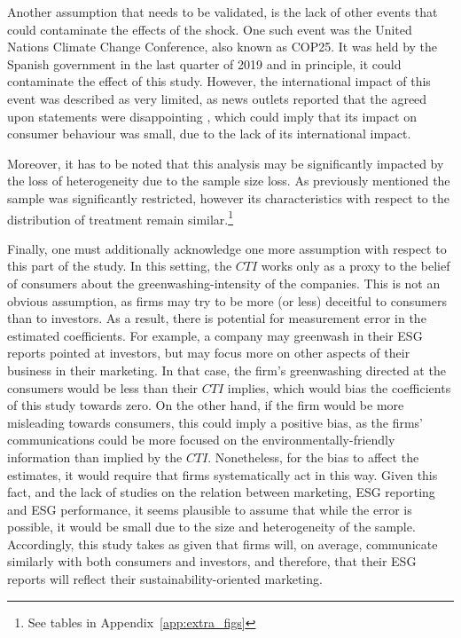 \documentclass[12pt]{article}
\begin{document}
Another assumption that needs to be validated, is the lack of other events that could contaminate the effects of the shock. One such event was the United Nations Climate Change Conference, also known as COP25. It was held by the Spanish government in the last quarter of 2019 and in principle, it could contaminate the effect of this study. However, the international impact of this event was described as very limited, as news outlets reported that the agreed upon statements were disappointing \parencite{SenguptaCOP252019}, which could imply that its impact on consumer behaviour was small, due to the lack of its international impact.

Moreover, it has to be noted that this analysis may be significantly impacted by the loss of heterogeneity due to the sample size loss. As previously mentioned the sample was significantly restricted, however its characteristics with respect to the distribution of treatment remain similar.\footnote{See tables in Appendix~\ref{app:extra_figs}}    

Finally, one must additionally acknowledge one more assumption with respect to this part of the study. In this setting, the $CTI$ works only as a proxy to the belief of consumers about the greenwashing-intensity of the companies. This is not an obvious assumption, as firms may try to be more (or less) deceitful to consumers than to investors. As a result, there is potential for  measurement error in the estimated coefficients. For example, a company may greenwash in their ESG reports pointed at investors, but may focus more on other aspects of their business in their marketing. In that case, the firm's greenwashing directed at the consumers would be less than their $CTI$ implies, which would bias the coefficients of this study towards zero. On the other hand, if the firm would be more misleading towards consumers, this could imply a positive bias, as the firms' communications could be more focused on the environmentally-friendly information than implied by the $CTI$. Nonetheless, for the bias to affect the estimates, it would require that firms systematically act in this way. Given this fact, and the lack of studies on the relation between marketing, ESG reporting and ESG performance, it seems plausible to assume that while the error is possible, it would be small due to the size and heterogeneity of the sample. Accordingly, this study takes as given that firms will, on average, communicate similarly with both consumers and investors, and therefore, that their ESG reports will reflect their sustainability-oriented marketing. 
\end{document}
